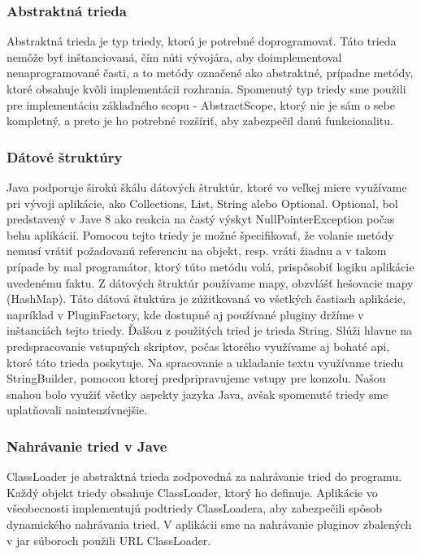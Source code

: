 {\subsubsection{Abstraktná trieda}
\indent Abstraktná trieda je typ triedy, ktorú je potrebné doprogramovať. Táto trieda nemôže byť inštanciovaná, čím núti vývojára, aby doimplementoval nenaprogramované časti, a to metódy označené ako abstraktné, prípadne metódy, ktoré obsahuje kvôli implementácii rozhrania. \cite{javabook}  Spomenutý typ triedy sme použili pre implementáciu základného scopu - AbstractScope, ktorý nie je sám o sebe kompletný, a preto je ho potrebné rozšíriť, aby zabezpečil danú funkcionalitu.

\subsubsection{Dátové štruktúry}
\indent Java podporuje širokú škálu dátových štruktúr, ktoré vo veľkej miere využívame pri vývoji aplikácie, ako Collections, List, String alebo Optional. \newline
\indent Optional, bol predstavený v Jave 8 ako reakcia na častý výskyt NullPointerException počas behu aplikácií. \cite{javabook}  Pomocou tejto triedy je možné špecifikovať, že volanie metódy nemusí vrátiť požadovanú referenciu na objekt, resp. vráti žiadnu a v takom prípade by mal programátor, ktorý túto metódu volá, prispôsobiť logiku aplikácie uvedenému faktu.
\newline
\indent Z dátových štruktúr používame mapy, obzvlášť hešovacie mapy (HashMap). Táto dátová štuktúra je zúžitkovaná vo všetkých častiach aplikácie, napríklad v PluginFactory, kde dostupné aj používané pluginy držíme v inštanciách tejto triedy.
\newline
\indent Ďalšou z použitých tried je trieda String. Slúži hlavne na predspracovanie vstupných skriptov, počas ktorého využívame aj bohaté \acrshort{api}, ktoré táto trieda poskytuje. Na spracovanie a ukladanie textu využívame triedu StringBuilder, pomocou ktorej predpripravujeme vstupy pre konzolu. 
\newline
\indent Našou snahou bolo využiť všetky aspekty jazyka Java, avšak spomenuté triedy sme uplatňovali naintenzívnejšie.

\subsubsection{Nahrávanie tried v Jave}
\indent ClassLoader je abstraktná trieda zodpovedná za nahrávanie tried do programu. Každý objekt triedy obsahuje ClassLoader, ktorý ho definuje. Aplikácie vo všeobecnosti implementujú podtriedy ClassLoadera, aby zabezpečili spôsob dynamického nahrávania tried. \cite{classloader} V aplikácii sme na nahrávanie pluginov zbalených v \acrshort{jar} súboroch použili URL ClassLoader.

}
